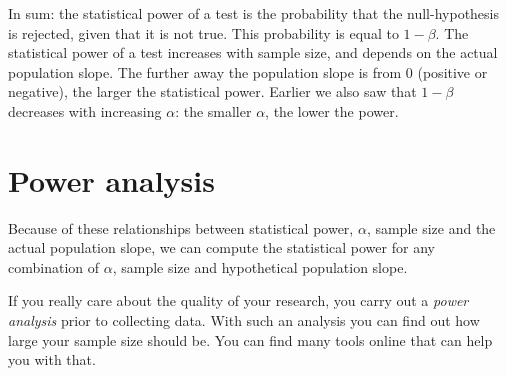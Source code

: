 \documentclass[]{book}\usepackage[]{graphicx}\usepackage[]{color}
\begin{document}
In sum: the statistical power of a test is the probability that the null-hypothesis is rejected, given that it is not true. This probability is equal to $1-\beta$. The statistical power of a test increases with sample size, and depends on the actual population slope. The further away the population slope is from 0 (positive or negative), the larger the statistical power. Earlier we also saw that $1-\beta$ decreases with increasing $\alpha$: the smaller $\alpha$, the lower the power.


% 
% 
% 
% 
% 
% 
% 
% 
% 
% 
% 
% 
% 


\section{Power analysis}
Because of these relationships between statistical power, $\alpha$, sample size and the actual population slope, we can compute the statistical power for any combination of $\alpha$, sample size and hypothetical population slope.


If you really care about the quality of your research, you carry out a \textit{power analysis} prior to collecting data. With such an analysis you can find out how large your sample size should be. You can find many tools online that can help you with that.
\end{document}
